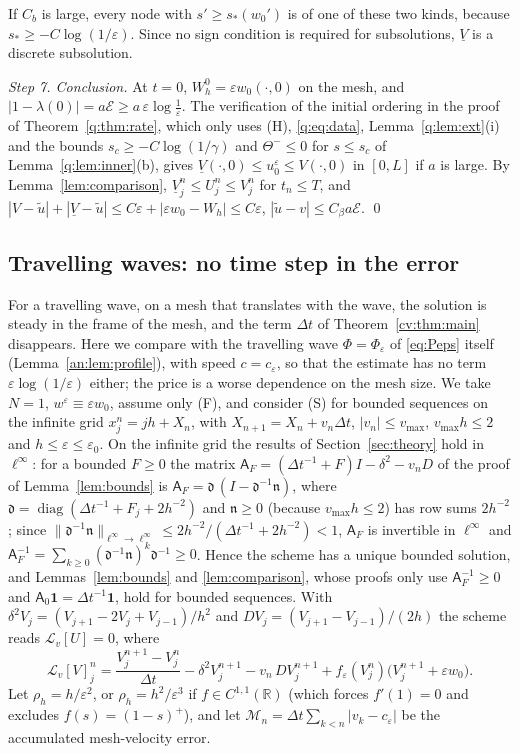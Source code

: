 \documentclass[11pt]{amsart}
\theoremstyle{definition}
\theoremstyle{remark}
\newcommand{\ve}{\varepsilon}
\newcommand{\R}{\mathbb{R}}
\newcommand{\Lop}{\mathcal{L}}
\begin{document}
If $C_b$ is large, every node with $s'\ge s_*(w_0')$ is of one of these two kinds, because
$s_*\ge-C\log(1/\ve)$. Since no sign condition is required for subsolutions, $\underline V$ is a
discrete subsolution.

\emph{Step 7. Conclusion.} At $t=0$, $W_h^0=\ve w_0(\cdot,0)$ on the mesh, and
$|1-\lambda(0)|=a\mathcal E\ge a\,\ve\log\frac1\ve$. The verification of the initial ordering in the proof of
Theorem~\ref{q:thm:rate}, which only uses (H), \eqref{q:eq:data}, Lemma~\ref{q:lem:ext}(i) and
the bounds $s_c\ge-C\log(1/\gamma)$ and $\Theta^-\le0$ for $s\le s_c$ of Lemma~\ref{q:lem:inner}(b),
gives $\underline V(\cdot,0)\le u_0^\ve\le V(\cdot,0)$ in $[0,L]$ if $a$ is large. By
Lemma~\ref{lem:comparison}, $\underline V^n_j\le U^n_j\le V^n_j$ for $t_n\le T$, and
$|V-\tilde u|+|\underline V-\tilde u|\le C\ve+|\ve w_0-W_h|\le C\ve$, $|\tilde u-v|\le C_\beta a\mathcal E$. \qed

\subsection{Travelling waves: no time step in the error}\label{an:sec:ale}

For a travelling wave, on a mesh that translates with the wave, the solution is steady
in the frame of the mesh, and the term $\Delta t$ of Theorem~\ref{cv:thm:main} disappears. Here
we compare with the travelling wave $\Phi=\Phi_\ve$ of \eqref{eq:Peps} itself
(Lemma~\ref{an:lem:profile}), with speed $c=c_\ve$, so that the estimate has no term
$\ve\log(1/\ve)$ either; the price is a worse dependence on the mesh size. We take $N=1$,
$w^\ve\equiv\ve w_0$, assume only (F), and consider (S) for bounded sequences on the
infinite grid $x^n_j=jh+X_n$, with $X_{n+1}=X_n+v_n\Delta t$, $|v_n|\le v_{\max}$,
$v_{\max}h\le2$ and $h\le\ve\le\ve_0$. On the infinite grid the results of
Section~\ref{sec:theory} hold in $\ell^\infty$: for a bounded $F\ge0$ the matrix
$\mathsf A_F=(\Delta t^{-1}+F)I-\delta^2-v_nD$ of the proof of Lemma~\ref{lem:bounds} is
$\mathsf A_F=\mathfrak d\,(I-\mathfrak d^{-1}\mathfrak n)$, where
$\mathfrak d=\operatorname{diag}(\Delta t^{-1}+F_j+2h^{-2})$ and $\mathfrak n\ge0$ (because
$v_{\max}h\le2$) has row sums $2h^{-2}$; since
$\|\mathfrak d^{-1}\mathfrak n\|_{\ell^\infty\to\ell^\infty}\le2h^{-2}/(\Delta t^{-1}+2h^{-2})<1$, $\mathsf A_F$ is
invertible in $\ell^\infty$ and $\mathsf A_F^{-1}=\sum_{k\ge0}(\mathfrak d^{-1}\mathfrak n)^k\mathfrak d^{-1}\ge0$.
Hence the scheme has a unique bounded solution, and
Lemmas~\ref{lem:bounds} and \ref{lem:comparison}, whose proofs only use $\mathsf A_F^{-1}\ge0$ and
$\mathsf A_0\mathbf 1=\Delta t^{-1}\mathbf 1$, hold for bounded sequences. With
$\delta^2V_j=(V_{j+1}-2V_j+V_{j-1})/h^2$ and $DV_j=(V_{j+1}-V_{j-1})/(2h)$ the scheme reads
$\Lop_v[U]=0$, where
\begin{equation}\label{an:eq:Lv}
\Lop_v[V]^n_j=\frac{V^{n+1}_j-V^n_j}{\Delta t}-\delta^2V^{n+1}_j-v_n\,DV^{n+1}_j
+f_\ve(V^n_j)\big(V^{n+1}_j+\ve w_0\big).
\end{equation}
Let $\rho_h=h/\ve^2$, or $\rho_h=h^2/\ve^3$ if $f\in C^{1,1}(\R)$ (which forces $f'(1)=0$ and
excludes $f(s)=(1-s)^+$), and let
$\mathcal M_n=\Delta t\sum_{k<n}|v_k-c_\ve|$ be the accumulated mesh-velocity error.
\end{document}

